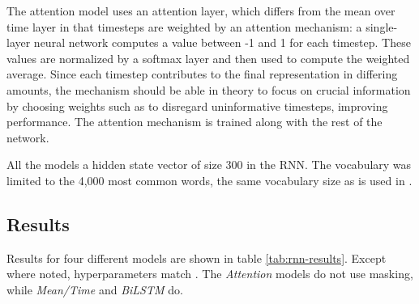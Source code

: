 
The attention model uses an attention layer, which differs from the mean over
time layer in that timesteps are weighted by an attention mechanism: a
single-layer neural network computes a value between -1 and 1 for each
timestep. These values are normalized by a softmax layer and then used to
compute the weighted average. Since each timestep contributes to the final
representation in differing amounts, the mechanism should be able in theory
to focus on crucial information by choosing weights such as to disregard
uninformative timesteps, improving performance. The attention mechanism is
trained along with the rest of the network.

All the models a hidden state vector of size 300 in the \ac{RNN}. The
vocabulary was limited to the 4,000 most common words, the same vocabulary
size as is used in \textcite{taghipour16}.


\subsection{Results}

Results for four different models are shown in table \ref{tab:rnn-results}.
Except where noted, hyperparameters match \textcite{taghipour16}. The
\emph{Attention} models do not use masking, while \emph{Mean/Time} and
\emph{BiLSTM} do. 

